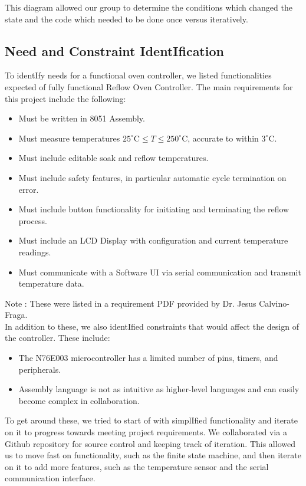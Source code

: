 \documentclass{article}
\begin{document}
This diagram allowed our group to determine the conditions which changed the state and the code which needed to be done once versus iteratively.

\subsection{Need and Constraint IdentIfication}
To identIfy needs for a functional oven controller, we listed functionalities expected of fully functional Reflow Oven Controller.
The main requirements for this project include the following:
\begin{itemize}
  \item Must be written in 8051 Assembly.
  \item Must measure temperatures $25^\circ\text{C} \leq T \leq 250^\circ\text{C}$, accurate to within $3^\circ\text{C}$.
  \item Must include editable soak and reflow temperatures.
  \item Must include safety features, in particular automatic cycle termination on error.
  \item Must include button functionality for initiating and terminating the reflow process.
  \item Must include an LCD Display with configuration and current temperature readings.
  \item Must communicate with a Software UI via serial communication and transmit temperature data.
\end{itemize}
Note : These were listed in a requirement PDF provided by Dr. Jesus Calvino-Fraga. \\

\noindent In addition to these, we also identIfied constraints that would affect the design of the controller. These include:
\begin{itemize}
  \item The N76E003 microcontroller has a limited number of pins, timers, and peripherals.
  \item Assembly language is not as intuitive as higher-level languages and can easily become complex in collaboration.
\end{itemize}

\noindent To get around these, we tried to start of with simplIfied functionality and iterate on it to progress towards meeting project requirements.
We collaborated via a Github repository for source control and keeping track of iteration. This allowed us to move fast on functionality, such as
the finite state machine, and then iterate on it to add more features, such as the temperature sensor and the serial communication interface.
\end{document}
